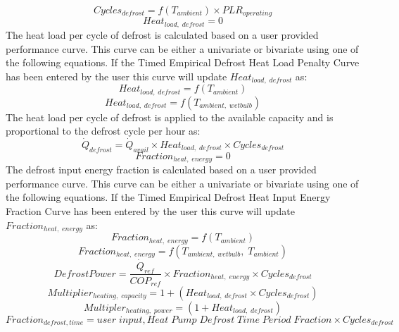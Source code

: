 \begin{equation}
{Cycles_{defrost} = f(T_{ambient})} \times PLR_{operating}
\end{equation}
\begin{equation}
Heat_{load,\; defrost} = 0
\end{equation}
The heat load per cycle of defrost is calculated based on a user provided performance curve. This curve can be either a univariate or bivariate using one of the following equations. If the Timed Empirical Defrost Heat Load Penalty Curve has been entered by the user this curve will update $Heat_{load,\; defrost}$ as:
\begin{equation}
Heat_{load,\; defrost} = f(T_{ambient})
\end{equation}
\begin{equation}
Heat_{load,\; defrost} = f(T_{ambient,\;wetbulb})
\end{equation}
The heat load per cycle of defrost is applied to the available capacity and is proportional to the defrost cycle per hour as:
\begin{equation}
\dot{Q}_{defrost} = \dot{Q}_{avail} \times Heat_{load,\; defrost} \times Cycles_{defrost}
\end{equation}
\begin{equation}
Fraction_{heat,\; energy} = 0
\end{equation}
The defrost input energy fraction is calculated based on a user provided performance curve. This curve can be either a univariate or bivariate using one of the following equations. If the Timed Empirical Defrost Heat Input Energy Fraction Curve has been entered by the user this curve will update $Fraction_{heat,\; energy}$ as:
\begin{equation}
Fraction_{heat,\; energy} = f(T_{ambient})
\end{equation}
\begin{equation}
Fraction_{heat,\; energy} = f(T_{ambient,\;wetbulb},\;T_{ambient})
\end{equation}
\begin{equation}
DefrostPower = \frac{\dot{Q}_{ref}}{COP_{ref}} \times Fraction_{heat,\; energy} \times Cycles_{defrost}
\end{equation}
\begin{equation}
Multiplier_{heating,\; capacity} = {1 + (Heat_{load,\; defrost} \times Cycles_{defrost})}
\end{equation}
\begin{equation}
Multipler_{heating,\; power} = {(1 + Heat_{load,\; defrost})}
\end{equation}
\begin{equation}
Fraction_{defrost, time} = user\; input, Heat\; Pump\; Defrost\; Time\; Period\; Fraction \times Cycles_{defrost}
\end{equation}


